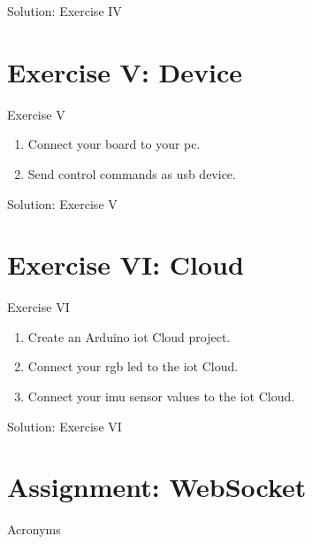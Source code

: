 \documentclass[aspectratio=169]{beamer}
\begin{document}
\begin{frame}{Solution: Exercise IV}
\end{frame}

\section{Exercise V:  Device}

\begin{frame}
    \begin{exampleblock}{Exercise V}
        \begin{enumerate}
            \item Connect your board to your \acs{pc}.
            \item Send control commands as \acs{usb} device.
        \end{enumerate}
    \end{exampleblock}
\end{frame}

\begin{frame}{Solution: Exercise V}
\end{frame}

\section{Exercise VI:  Cloud}

\begin{frame}
    \begin{exampleblock}{Exercise VI}
        \begin{enumerate}
            \item Create an Arduino\textregistered{} \acs{iot} Cloud project.
            \item Connect your \acs{rgb} \acs{led} to the \acs{iot} Cloud.
            \item Connect your \acs{imu} sensor values to the \acs{iot} Cloud.
        \end{enumerate}
    \end{exampleblock}
\end{frame}

\begin{frame}{Solution: Exercise VI}
\end{frame}

\section{Assignment: WebSocket}

\appendix

\begin{frame}[allowframebreaks]{Acronyms}
    \printglossary[type=\acronymtype, nonumberlist]
\end{frame}

%     
\end{document}
